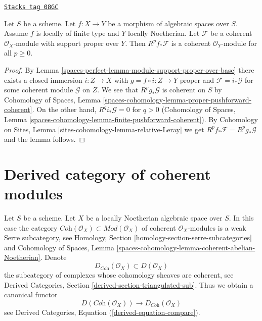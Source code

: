 \begin{lemma}
\label{spaces-perfect-lemma-support-proper-over-base-pushforward}
\href{https://stacks.math.columbia.edu/tag/08GC}{\texttt{Stacks tag 08GC}}

Let $S$ be a scheme. Let $f : X \to Y$ be a morphism of algebraic spaces
over $S$. Assume $f$ is locally of finite type and $Y$ locally Noetherian.
Let $\mathcal{F}$ be a coherent $\mathcal{O}_X$-module with support
proper over $Y$. Then $R^pf_*\mathcal{F}$ is a coherent
$\mathcal{O}_Y$-module for all $p \geq 0$.
\end{lemma}

\begin{proof}
By Lemma \ref{spaces-perfect-lemma-module-support-proper-over-base}
there exists a closed immersion $i : Z \to X$ with
$g = f \circ i : Z \to Y$ proper and
$\mathcal{F} = i_*\mathcal{G}$ for some coherent module $\mathcal{G}$
on $Z$. We see that $R^pg_*\mathcal{G}$
is coherent on $S$ by Cohomology of Spaces, Lemma
\ref{spaces-cohomology-lemma-proper-pushforward-coherent}.
On the other hand, $R^qi_*\mathcal{G} = 0$ for $q > 0$
(Cohomology of Spaces, Lemma
\ref{spaces-cohomology-lemma-finite-pushforward-coherent}).
By Cohomology on Sites, Lemma \ref{sites-cohomology-lemma-relative-Leray}
we get $R^pf_*\mathcal{F} = R^pg_*\mathcal{G}$ and the lemma follows.
\end{proof}

\section{Derived category of coherent modules}
\label{spaces-perfect-section-derived-coherent}
Let $S$ be a scheme. Let $X$ be a locally Noetherian algebraic space over $S$.
In this case the category
$\textit{Coh}(\mathcal{O}_X) \subset \textit{Mod}(\mathcal{O}_X)$
of coherent $\mathcal{O}_X$-modules is a weak Serre subcategory, see
Homology, Section \ref{homology-section-serre-subcategories}
and
Cohomology of Spaces, Lemma
\ref{spaces-cohomology-lemma-coherent-abelian-Noetherian}.
Denote
$$
D_{\textit{Coh}}(\mathcal{O}_X) \subset D(\mathcal{O}_X)
$$
the subcategory of complexes whose cohomology sheaves are coherent, see
Derived Categories, Section \ref{derived-section-triangulated-sub}.
Thus we obtain a canonical functor
\begin{equation}
\label{equation-compare-coherent}
D(\textit{Coh}(\mathcal{O}_X))
\longrightarrow
D_{\textit{Coh}}(\mathcal{O}_X)
\end{equation}
see Derived Categories, Equation (\ref{derived-equation-compare}).

